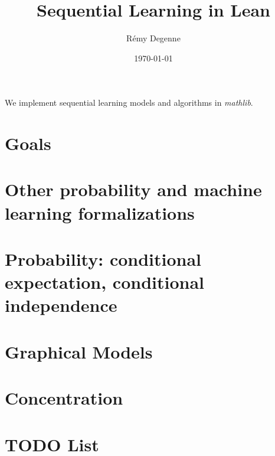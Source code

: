 \documentclass{article}
\title{Sequential Learning in Lean}
\author{Rémy Degenne}
\date{\today}
\begin{document}
\maketitle

We implement sequential learning models and algorithms in \emph{mathlib}.

\section{Goals}



\section{Other probability and machine learning formalizations}
\label{sec:other_probability_and_machine_learning_formalizations}



\section{Probability: conditional expectation, conditional independence}
\label{sec:conditional_independence}



\section{Graphical Models}
\label{sec:graphical_models}



\section{Concentration}
\label{sec:concentration}



\section{TODO List}
\label{sec:todo_list}






\end{document}
